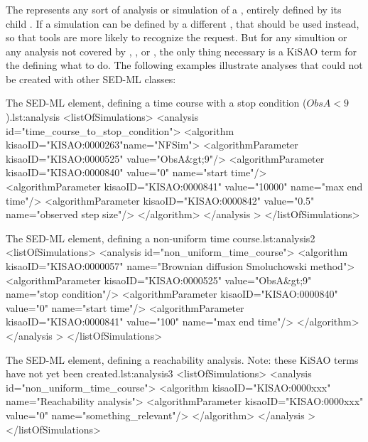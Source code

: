 \begin{blockChanged}
\subsubsection{}
\label{class:analysis}
The  represents any sort of analysis or simulation of a \Model, entirely defined by its child \Algorithm.  If a simulation can be defined by a different \Simulation, that should be used instead, so that tools are more likely to recognize the request.  But for any simultion or any analysis not covered by \SteadyState, \OneStep, or \UniformTimeCourse, the only thing necessary is a KiSAO term for the \Algorithm defining what to do.  The following examples illustrate analyses that could not be created with other SED-ML \Simulation classes:


\begin{myXmlLst}{The SED-ML  element, defining a time course with a stop condition ($ObsA<9$).}{lst:analysis}
<listOfSimulations>
    <analysis id="time_course_to_stop_condition">
        <algorithm kisaoID="KISAO:0000263"name="NFSim">
            <algorithmParameter kisaoID="KISAO:0000525" value="ObsA&gt;9"/>
            <algorithmParameter kisaoID="KISAO:0000840" value="0" name="start time"/>
            <algorithmParameter kisaoID="KISAO:0000841" value="10000" name="max end time"/>
            <algorithmParameter kisaoID="KISAO:0000842" value="0.5" name="observed step size"/>
        </algorithm>
    </analysis >
</listOfSimulations>
\end{myXmlLst}


\begin{myXmlLst}{The SED-ML  element, defining a non-uniform time course.}{lst:analysis2}
<listOfSimulations>
    <analysis id="non_uniform_time_course">
        <algorithm kisaoID="KISAO:0000057" name="Brownian diffusion Smoluchowski method">
            <algorithmParameter kisaoID="KISAO:0000525" value="ObsA&gt;9" name="stop condition"/>
            <algorithmParameter kisaoID="KISAO:0000840" value="0" name="start time"/>
            <algorithmParameter kisaoID="KISAO:0000841" value="100" name="max end time"/>
        </algorithm>
    </analysis >
</listOfSimulations>
\end{myXmlLst}


\begin{myXmlLst}{The SED-ML  element, defining a reachability analysis.  Note: these KiSAO terms have not yet been created.}{lst:analysis3}
<listOfSimulations>
    <analysis id="non_uniform_time_course">
        <algorithm kisaoID="KISAO:0000xxx" name="Reachability analysis">
            <algorithmParameter kisaoID="KISAO:0000xxx" value="0" name="something_relevant"/>
        </algorithm>
    </analysis >
</listOfSimulations>
\end{myXmlLst}
\end{blockChanged}


